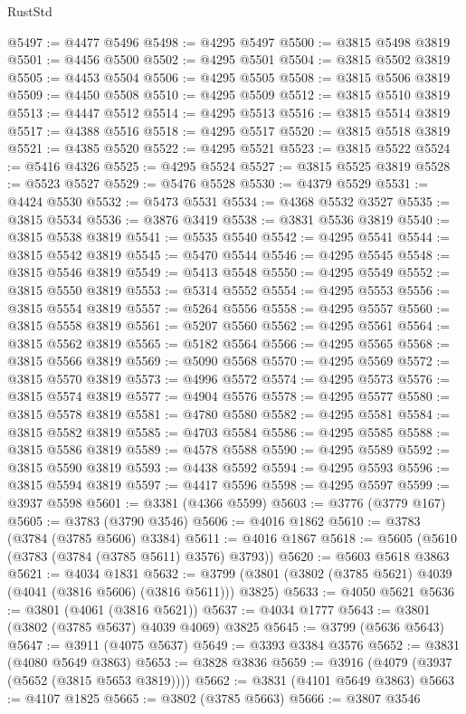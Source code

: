 \begin{lexlean}{RustStd}
\begin{coremodule}
@5497 := @4477 @5496
@5498 := @4295 @5497
@5500 := @3815 @5498 @3819
@5501 := @4456 @5500
@5502 := @4295 @5501
@5504 := @3815 @5502 @3819
@5505 := @4453 @5504
@5506 := @4295 @5505
@5508 := @3815 @5506 @3819
@5509 := @4450 @5508
@5510 := @4295 @5509
@5512 := @3815 @5510 @3819
@5513 := @4447 @5512
@5514 := @4295 @5513
@5516 := @3815 @5514 @3819
@5517 := @4388 @5516
@5518 := @4295 @5517
@5520 := @3815 @5518 @3819
@5521 := @4385 @5520
@5522 := @4295 @5521
@5523 := @3815 @5522
@5524 := @5416 @4326
@5525 := @4295 @5524
@5527 := @3815 @5525 @3819
@5528 := @5523 @5527
@5529 := @5476 @5528
@5530 := @4379 @5529
@5531 := @4424 @5530
@5532 := @5473 @5531
@5534 := @4368 @5532 @3527
@5535 := @3815 @5534
@5536 := @3876 @3419
@5538 := @3831 @5536 @3819
@5540 := @3815 @5538 @3819
@5541 := @5535 @5540
@5542 := @4295 @5541
@5544 := @3815 @5542 @3819
@5545 := @5470 @5544
@5546 := @4295 @5545
@5548 := @3815 @5546 @3819
@5549 := @5413 @5548
@5550 := @4295 @5549
@5552 := @3815 @5550 @3819
@5553 := @5314 @5552
@5554 := @4295 @5553
@5556 := @3815 @5554 @3819
@5557 := @5264 @5556
@5558 := @4295 @5557
@5560 := @3815 @5558 @3819
@5561 := @5207 @5560
@5562 := @4295 @5561
@5564 := @3815 @5562 @3819
@5565 := @5182 @5564
@5566 := @4295 @5565
@5568 := @3815 @5566 @3819
@5569 := @5090 @5568
@5570 := @4295 @5569
@5572 := @3815 @5570 @3819
@5573 := @4996 @5572
@5574 := @4295 @5573
@5576 := @3815 @5574 @3819
@5577 := @4904 @5576
@5578 := @4295 @5577
@5580 := @3815 @5578 @3819
@5581 := @4780 @5580
@5582 := @4295 @5581
@5584 := @3815 @5582 @3819
@5585 := @4703 @5584
@5586 := @4295 @5585
@5588 := @3815 @5586 @3819
@5589 := @4578 @5588
@5590 := @4295 @5589
@5592 := @3815 @5590 @3819
@5593 := @4438 @5592
@5594 := @4295 @5593
@5596 := @3815 @5594 @3819
@5597 := @4417 @5596
@5598 := @4295 @5597
@5599 := @3937 @5598
@5601 := @3381 (@4366 @5599)
@5603 := @3776 (@3779 @167)
@5605 := @3783 (@3790 @3546)
@5606 := @4016 @1862
@5610 := @3783 (@3784 (@3785 @5606) @3384)
@5611 := @4016 @1867
@5618 := @5605 (@5610 (@3783 (@3784 (@3785 @5611) @3576) @3793))
@5620 := @5603 @5618 @3863
@5621 := @4034 @1831
@5632 := @3799 (@3801 (@3802 (@3785 @5621) @4039 (@4041 (@3816 @5606) (@3816 @5611))) @3825)
@5633 := @4050 @5621
@5636 := @3801 (@4061 (@3816 @5621))
@5637 := @4034 @1777
@5643 := @3801 (@3802 (@3785 @5637) @4039 @4069) @3825
@5645 := @3799 (@5636 @5643)
@5647 := @3911 (@4075 @5637)
@5649 := @3393 @3384 @3576
@5652 := @3831 (@4080 @5649 @3863)
@5653 := @3828 @3836
@5659 := @3916 (@4079 (@3937 (@5652 (@3815 @5653 @3819))))
@5662 := @3831 (@4101 @5649 @3863)
@5663 := @4107 @1825
@5665 := @3802 (@3785 @5663)
@5666 := @3807 @3546

\end{coremodule}
\end{lexlean}
